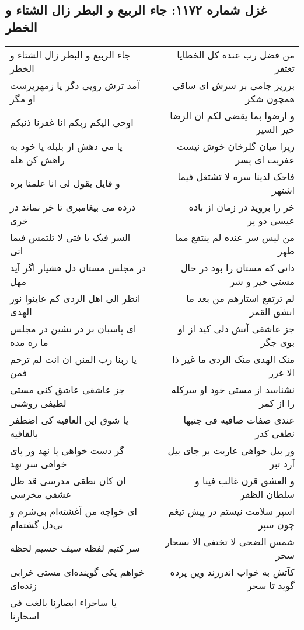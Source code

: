 \begin{center}
\section*{غزل شماره ۱۱۷۲: جاء الربیع و البطر زال الشتاء و الخطر}
\label{sec:1172}
\begin{longtable}{l p{0.5cm} r}
جاء الربیع و البطر زال الشتاء و الخطر
&&
من فضل رب عنده کل الخطایا تغتفر
\\
آمد ترش رویی دگر یا زمهریرست او مگر
&&
برریز جامی بر سرش ای ساقی همچون شکر
\\
اوحی الیکم ربکم انا غفرنا ذنبکم
&&
و ارضوا بما یقضی لکم ان الرضا خیر السیر
\\
یا می دهش از بلبله یا خود به راهش کن هله
&&
زیرا میان گلرخان خوش نیست عفریت ای پسر
\\
و قایل یقول لی انا علمنا بره
&&
فاحک لدینا سره لا تشتغل فیما اشتهر
\\
درده می بیغامبری تا خر نماند در خری
&&
خر را بروید در زمان از باده عیسی دو پر
\\
السر فیک یا فتی لا تلتمس فیما اتی
&&
من لیس سر عنده لم ینتفع مما ظهر
\\
در مجلس مستان دل هشیار اگر آید مهل
&&
دانی که مستان را بود در حال مستی خیر و شر
\\
انظر الی اهل الردی کم عاینوا نور الهدی
&&
لم ترتفع استارهم من بعد ما انشق القمر
\\
ای پاسبان بر در نشین در مجلس ما ره مده
&&
جز عاشقی آتش دلی کید از او بوی جگر
\\
یا ربنا رب المنن ان انت لم ترحم فمن
&&
منک الهدی منک الردی ما غیر ذا الا غرر
\\
جز عاشقی عاشق کنی مستی لطیفی روشنی
&&
نشناسد از مستی خود او سرکله را از کمر
\\
یا شوق این العافیه کی اضطفر بالقافیه
&&
عندی صفات صافیه فی جنبها نطقی کدر
\\
گر دست خواهی پا نهد ور پای خواهی سر نهد
&&
ور بیل خواهی عاریت بر جای بیل آرد تبر
\\
ان کان نطقی مدرسی قد ظل عشقی مخرسی
&&
و العشق قرن غالب فینا و سلطان الظفر
\\
ای خواجه من آغشته‌ام بی‌شرم و بی‌دل گشته‌ام
&&
اسپر سلامت نیستم در پیش تیغم چون سپر
\\
سر کتیم لفظه سیف حسیم لحظه
&&
شمس الضحی لا تختفی الا بسحار سحر
\\
خواهم یکی گوینده‌ای مستی خرابی زنده‌ای
&&
کآتش به خواب اندرزند وین پرده گوید تا سحر
\\
یا ساحراء ابصارنا بالغت فی اسحارنا
&&

\end{longtable}
\end{center}
